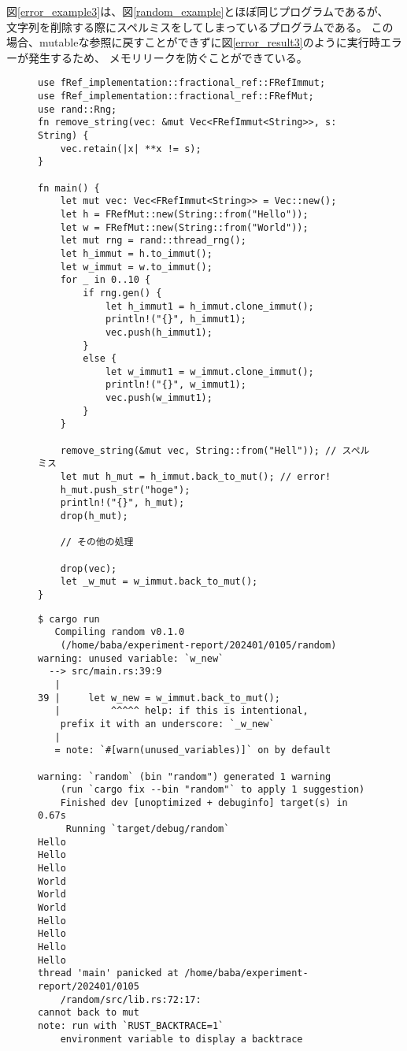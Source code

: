 \documentclass{sumiilab-paper}
\theoremstyle{mystyle}
\numberwithin{definition}{chapter} %
\begin{document}
図\ref{error_example3}は、図\ref{random_example}とほぼ同じプログラムであるが、
文字列を削除する際にスペルミスをしてしまっているプログラムである。
この場合、mutableな参照に戻すことができずに図\ref{error_result3}のように実行時エラーが発生するため、
メモリリークを防ぐことができている。
\begin{figure}[p]
\begin{lstlisting}[caption=ユーザのミスを検出する例, 
  label=error_example3, captionpos=b]
use fRef_implementation::fractional_ref::FRefImmut;
use fRef_implementation::fractional_ref::FRefMut;
use rand::Rng;
fn remove_string(vec: &mut Vec<FRefImmut<String>>, s: String) {
    vec.retain(|x| **x != s);
}

fn main() {
    let mut vec: Vec<FRefImmut<String>> = Vec::new();
    let h = FRefMut::new(String::from("Hello"));
    let w = FRefMut::new(String::from("World"));
    let mut rng = rand::thread_rng();
    let h_immut = h.to_immut();
    let w_immut = w.to_immut();
    for _ in 0..10 {
        if rng.gen() {
            let h_immut1 = h_immut.clone_immut();
            println!("{}", h_immut1);
            vec.push(h_immut1);
        }
        else {
            let w_immut1 = w_immut.clone_immut();
            println!("{}", w_immut1);
            vec.push(w_immut1);
        }
    }

    remove_string(&mut vec, String::from("Hell")); // スペルミス
    let mut h_mut = h_immut.back_to_mut(); // error!
    h_mut.push_str("hoge");
    println!("{}", h_mut);
    drop(h_mut);

    // その他の処理

    drop(vec);
    let _w_mut = w_immut.back_to_mut();
}
\end{lstlisting}
\end{figure}
\begin{figure}[p]
\begin{lstlisting}[caption=ユーザのミスによるエラー, 
  label=error_result3, captionpos=b]
$ cargo run
   Compiling random v0.1.0 
    (/home/baba/experiment-report/202401/0105/random)
warning: unused variable: `w_new`
  --> src/main.rs:39:9
   |
39 |     let w_new = w_immut.back_to_mut();
   |         ^^^^^ help: if this is intentional,
    prefix it with an underscore: `_w_new`
   |
   = note: `#[warn(unused_variables)]` on by default

warning: `random` (bin "random") generated 1 warning 
    (run `cargo fix --bin "random"` to apply 1 suggestion)
    Finished dev [unoptimized + debuginfo] target(s) in 0.67s
     Running `target/debug/random`
Hello
Hello
Hello
World
World
World
Hello
Hello
Hello
Hello
thread 'main' panicked at /home/baba/experiment-report/202401/0105
    /random/src/lib.rs:72:17:
cannot back to mut
note: run with `RUST_BACKTRACE=1` 
    environment variable to display a backtrace
\end{lstlisting}
\end{figure}
\end{document}

